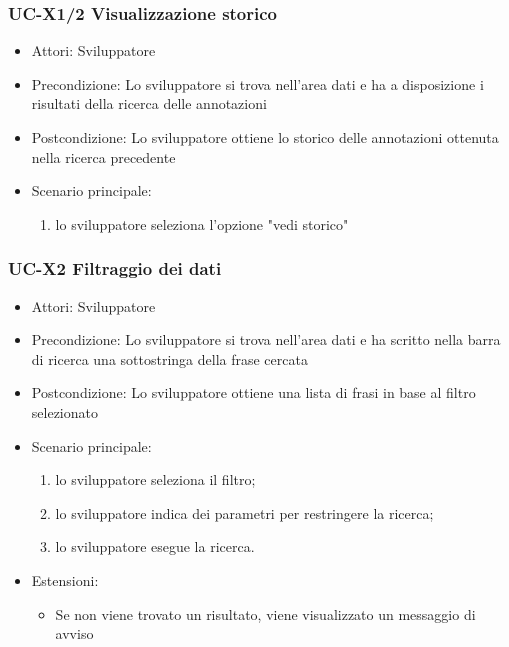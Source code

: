 	\subsubsection{UC-X1/2 Visualizzazione storico}
		\begin{itemize}
			\item Attori: Sviluppatore
			\item Precondizione: Lo sviluppatore si trova nell'area dati e ha a disposizione i risultati della ricerca delle annotazioni
			\item Postcondizione: Lo sviluppatore ottiene lo storico delle annotazioni ottenuta nella ricerca precedente
			\item Scenario principale:
			\begin{enumerate}
				\item lo sviluppatore seleziona l'opzione "vedi storico"
			\end{enumerate}
		\end{itemize}
	
	\subsubsection{UC-X2 Filtraggio dei dati}	
		\begin{itemize}
			\item Attori: Sviluppatore
			\item Precondizione: Lo sviluppatore si trova nell'area dati e ha scritto nella barra di ricerca una sottostringa della frase cercata
			\item Postcondizione: Lo sviluppatore ottiene una lista di frasi in base al filtro selezionato
			\item Scenario principale:
				\begin{enumerate}
					\item lo sviluppatore seleziona il filtro;
					\item lo sviluppatore indica dei parametri per restringere la ricerca;
					\item lo sviluppatore esegue la ricerca.
				\end{enumerate}
			\item Estensioni:
				\begin{itemize}
					\item Se non viene trovato un risultato, viene visualizzato un messaggio di avviso
				\end{itemize}				
		\end{itemize}
	
	
